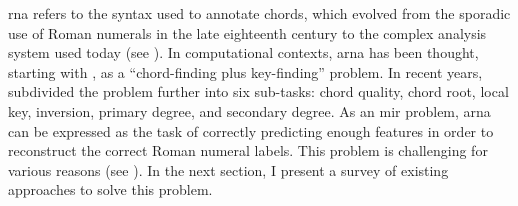 

\gls{rna} refers to the syntax used to annotate chords,
which evolved from the sporadic use of Roman numerals in the
late eighteenth century to the complex analysis system used
today (see ). In
computational contexts, \gls{arna} has been thought,
starting with \textcite{temperley1997algorithm}, as a
``chord-finding plus key-finding'' problem. In recent years,
\textcite{chen2018functional} subdivided the problem further
into six sub-tasks: chord quality, chord root, local key,
inversion, primary degree, and secondary degree. As an
\gls{mir} problem, \gls{arna} can be expressed as the task
of correctly predicting enough features in order to
reconstruct the correct Roman numeral labels. This problem
is challenging for various reasons (see
). In the next section, I present a
survey of existing approaches to solve this problem.
